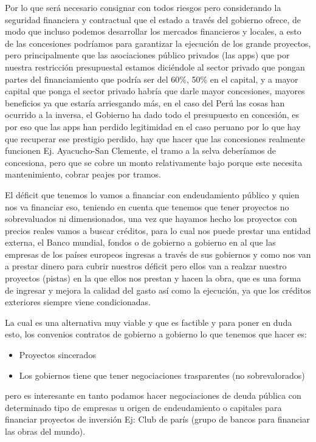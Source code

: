 \documentclass[
  letterpaper,
  DIV=11,
  numbers=noendperiod]{scrartcl}
\providecommand{\tightlist}{%
  \setlength{\itemsep}{0pt}\setlength{\parskip}{0pt}}\usepackage{longtable,booktabs,array}
\begin{document}
Por lo que será necesario consignar con todos riesgos pero considerando
la seguridad financiera y contractual que el estado a través del
gobierno ofrece, de modo que incluso podemos desarrollar los mercados
financieros y locales, a esto de las concesiones podríamos para
garantizar la ejecución de los grande proyectos, pero principalmente que
las asociaciones público privados (las apps) que por nuestra restricción
presupuestal estamos diciéndole al sector privado que pongan partes del
financiamiento que podría ser del 60\%, 50\% en el capital, y a mayor
capital que ponga el sector privado habría que darle mayor concesiones,
mayores beneficios ya que estaría arriesgando más, en el caso del Perú
las cosas han ocurrido a la inversa, el Gobierno ha dado todo el
presupuesto en concesión, es por eso que las apps han perdido
legitimidad en el caso peruano por lo que hay que recuperar ese
prestigio perdido, hay que hacer que las concesiones realmente funcionen
Ej. Ayacucho-San Clemente, el tramo a la selva deberíamos de concesiona,
pero que se cobre un monto relativamente bajo porque este necesita
mantenimiento, cobrar peajes por tramos.

El déficit que tenemos lo vamos a financiar con endeudamiento público y
quien nos va financiar eso, teniendo en cuenta que tenemos que tener
proyectos no sobrevaluados ni dimensionados, una vez que hayamos hecho
los proyectos con precios reales vamos a buscar créditos, para lo cual
nos puede prestar una entidad externa, el Banco mundial, fondos o de
gobierno a gobierno en al que las empresas de los países europeos
ingresas a través de sus gobiernos y como nos van a prestar dinero para
cubrir nuestros déficit pero ellos van a realzar nuestro proyectos
(pistas) en la que ellos nos prestan y hacen la obra, que es una forma
de ingresar y mejora la calidad del gasto así como la ejecución, ya que
los créditos exteriores siempre viene condicionadas.

La cual es una alternativa muy viable y que es factible y para poner en
duda esto, los convenios contratos de gobierno a gobierno lo que tenemos
que hacer es:

\begin{itemize}
\tightlist
\item
  Proyectos sincerados
\item
  Los gobiernos tiene que tener negociaciones trasparentes (no
  sobrevalorados)
\end{itemize}

pero es interesante en tanto podamos hacer negociaciones de deuda
pública con determinado tipo de empresas u origen de endeudamiento o
capitales para financiar proyectos de inversión Ej: Club de parís (grupo
de bancos para financiar las obras del mundo).
\end{document}
